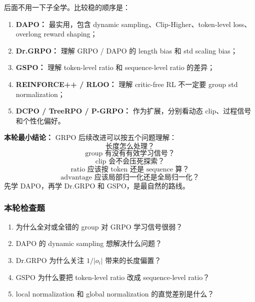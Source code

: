 后面不用一下子全学。比较稳的顺序是：

\begin{enumerate}[leftmargin=1.5em]
  \item \textbf{DAPO：} 最实用，包含 dynamic sampling、Clip-Higher、token-level loss、overlong reward shaping；
  \item \textbf{Dr.GRPO：} 理解 GRPO / DAPO 的 length bias 和 std scaling bias；
  \item \textbf{GSPO：} 理解 token-level ratio 和 sequence-level ratio 的差异；
  \item \textbf{REINFORCE++ / RLOO：} 理解 critic-free RL 不一定要 group std normalization；
  \item \textbf{DCPO / TreeRPO / P-GRPO：} 作为扩展，分别看动态 clip、过程信号和个性化偏好。
\end{enumerate}

\begin{summarybox}
\textbf{本轮最小结论：} GRPO 后续改进可以按五个问题理解：
\[
\text{长度怎么处理？}
\]
\[
\text{group 有没有有效学习信号？}
\]
\[
\text{clip 会不会压死探索？}
\]
\[
\text{ratio 应该按 token 还是 sequence 算？}
\]
\[
\text{advantage 应该局部归一化还是全局归一化？}
\]
先学 DAPO，再学 Dr.GRPO 和 GSPO，是最自然的路线。
\end{summarybox}

\subsubsection{本轮检查题}

\begin{enumerate}[leftmargin=1.5em]
  \item 为什么全对或全错的 group 对 GRPO 学习信号很弱？
  \item DAPO 的 dynamic sampling 想解决什么问题？
  \item Dr.GRPO 为什么关注 $1/|o_i|$ 带来的长度偏置？
  \item GSPO 为什么要把 token-level ratio 改成 sequence-level ratio？
  \item local normalization 和 global normalization 的直觉差别是什么？
\end{enumerate}
